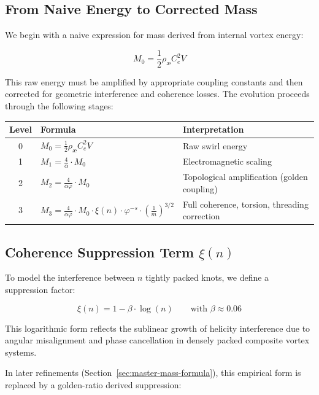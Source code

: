 \documentclass[12pt]{article}
\begin{document}
\subsection*{From Naive Energy to Corrected Mass}

We begin with a naive expression for mass derived from internal vortex energy:

\[
M_0 = \frac{1}{2} \rho_\text{\ae} C_e^2 V
\]

This raw energy must be amplified by appropriate coupling constants and then corrected for geometric interference and coherence losses. The evolution proceeds through the following stages:

\begin{center}
\begin{tabular}{|c|l|l|}
\hline
\textbf{Level} & \textbf{Formula} & \textbf{Interpretation} \\
\hline
0 & \( M_0 = \frac{1}{2} \rho_\text{\ae} C_e^2 V \) & Raw swirl energy \\
1 & \( M_1 = \frac{4}{\alpha} \cdot M_0 \) & Electromagnetic scaling \\
2 & \( M_2 = \frac{4}{\alpha \varphi} \cdot M_0 \) & Topological amplification (golden coupling) \\
3 & \( M_3 = \frac{4}{\alpha \varphi} \cdot M_0 \cdot \xi(n) \cdot \varphi^{-s} \cdot \left( \frac{1}{m} \right)^{3/2} \) & Full coherence, torsion, threading correction \\
\hline
\end{tabular}
\end{center}

\subsection*{Coherence Suppression Term \( \xi(n) \)}

To model the interference between \( n \) tightly packed knots, we define a suppression factor:

\begin{equation}
\boxed{
\xi(n) = 1 - \beta \cdot \log(n)
}
\qquad \text{with } \beta \approx 0.06
\end{equation}

This logarithmic form reflects the sublinear growth of helicity interference due to angular misalignment and phase cancellation in densely packed composite vortex systems.

In later refinements (Section~\ref{sec:master-mass-formula}), this empirical form is replaced by a golden-ratio derived suppression:
\end{document}
